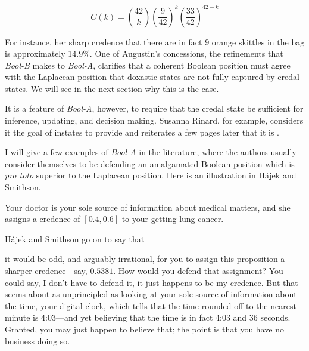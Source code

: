 \documentclass[11pt]{article}
\newcommand{\anderson}[0]{\textit{Bool-A}}
\newcommand{\augustin}[0]{\textit{Bool-B}}
\begin{document}
\begin{equation}
  \label{eq:bern}
  C(k)=\binom{42}{k}\left(\frac{9}{42}\right)^{k}\left(\frac{33}{42}\right)^{42-k}
\end{equation}

For instance, her sharp credence that there are in fact $9$ orange
skittles in the bag is approximately 14.9\%. One of Augustin's
concessions, the refinements that {\augustin} makes to {\anderson},
clarifies that a coherent Boolean position must agree with the
Laplacean position that doxastic states are not fully captured by
credal states. We will see in the next section why this is the case.

It is a feature of {\anderson}, however, to require that the credal
state be sufficient for inference, updating, and decision making.
Susanna Rinard, for example, considers it the goal of instates to
provide 
 and reiterates a few pages later that it is
.

I will give a few examples of {\anderson} in the literature, where the
authors usually consider themselves to be defending an amalgamated
Boolean position which is \emph{pro toto} superior to the Laplacean
position. Here is an illustration in H{\'a}jek and Smithson.

\begin{quotex}
  \label{ex:crude} Your doctor is your
  sole source of information about medical matters, and she assigns a
  credence of $[0.4,0.6]$ to your getting lung cancer.
\end{quotex}

H{\'a}jek and Smithson go on to say that 

\begin{quotex}
  it would be odd, and arguably irrational, for you to assign this
  proposition a sharper credence---say, $0.5381$. How would you defend
  that assignment? You could say, I don't have to defend it, it just
  happens to be my credence. But that seems about as unprincipled as
  looking at your sole source of information about the time, your
  digital clock, which tells that the time rounded off to the nearest
  minute is 4:03---and yet believing that the time is in fact 4:03 and
  36 seconds. Granted, you may just happen to believe that; the point
  is that you have no business doing so.
\end{quotex}
\end{document}
